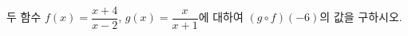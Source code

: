 \hspace*{2mm}\begin{minipage}[t]{\dimexpr\linewidth-2mm\relax}\vspace{0pt}
두 함수 $f(x)=\dfrac{x+4}{x-2}$, $g(x)=\dfrac{x}{x+1}$에 대하여 $(g\circ f)(-6)$의 값을 구하시오.\end{minipage}
